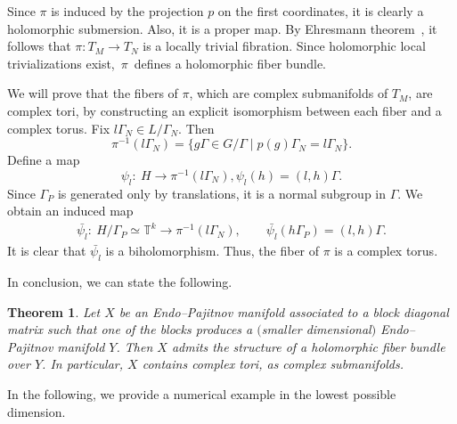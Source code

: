\documentclass[10pt,a4paper]{amsart}
\newcommand{\6}{\partial}
\numberwithin{equation}{section}
\newtheorem{Theorem}{Theorem}[section]
\begin{document}
Since $\pi$ is induced by the projection $p$ on the first coordinates, it is clearly a holomorphic submersion. Also, it is a proper map. By Ehresmann theorem~\cite[Corollary 6.2.3]{huy}, it follows that $\pi\colon T_M \longrightarrow T_N$ is a locally trivial fibration. Since holomorphic local trivializations exist,~$\pi$~defines a holomorphic fiber bundle.

We will prove that the fibers of $\pi$, which are complex submanifolds of $T_M$, are complex tori, by constructing an explicit isomorphism between each fiber and a complex torus.
Fix $l\Gamma_N \in L/ \Gamma_N$. Then
\[\pi^{-1}(l\Gamma_N)=\{g\Gamma \in G/ \Gamma \mid p(g)\Gamma_N=l \Gamma_N\}.\]
Define a map
\[\psi_l\colon \ H \longrightarrow \pi^{-1}(l \Gamma_N), \psi_l(h)=(l,h)\Gamma.\]
Since $\Gamma_P$ is generated only by translations, it is a normal subgroup in $\Gamma$.
We obtain an induced map
\begin{gather*}
\bar{\psi_l}\colon\ H/\Gamma_P \simeq \mathbb T^{k} \longrightarrow \pi^{-1}(l \Gamma_N),\qquad
\bar{\psi_l}(h \Gamma_P)=(l,h)\Gamma.
\end{gather*}
It is clear that $\bar{\psi_l}$ is a biholomorphism.
Thus, the fiber of $\pi$ is a complex torus.

In conclusion, we can state the following.


\begin{Theorem}\label{ex_th}
Let $X$ be an Endo--Pajitnov manifold associated to a block diagonal matrix such that one of the blocks produces a $($smaller dimensional$)$ Endo--Pajitnov manifold $Y$. Then $X$ admits the structure of a holomorphic fiber bundle over $Y$. In particular, $X$ contains complex tori, as complex submanifolds.
\end{Theorem}


In the following, we provide a numerical example in the lowest possible dimension.
\end{document}

